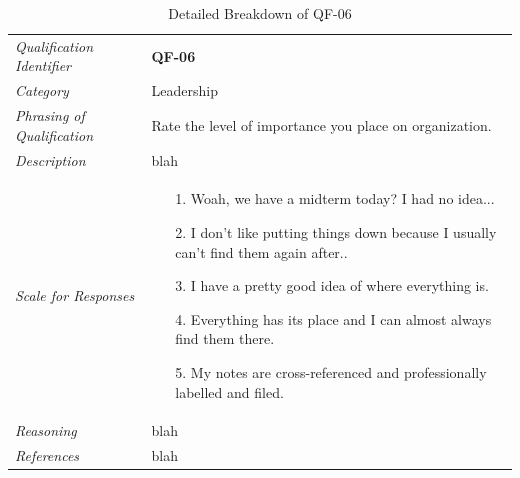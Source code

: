 \documentclass[12pt,letterpaper]{article}
\begin{document}
\begin{table}[H]
	\caption{Detailed Breakdown of QF-06}
	\begin{tabu} to 
		\toprule
		Qualification Identifier & {\bf QF-06}\\
		Category & Leadership \\
		Phrasing of Qualification & Rate the level of importance you place on organization.\\
		Description & blah\\
		Scale for Responses &
		\begin{minipage}[t]{\linewidth}
			\begin{enumerate}
				\item[1.] Woah, we have a midterm today? I had no idea...
				\item[2.] I don't like putting things down because I usually can't find them again after..
				\item[3.] I have a pretty good idea of where everything is.
				\item[4.] Everything has its place and I can almost always find them there.
				\item[5.] My notes are cross-referenced and professionally labelled and filed.
			\end{enumerate}
		\end{minipage}\\
		Reasoning & blah\\
		References & blah\\
		\toprule
	\end{tabu}
\end{table}
\end{document}
